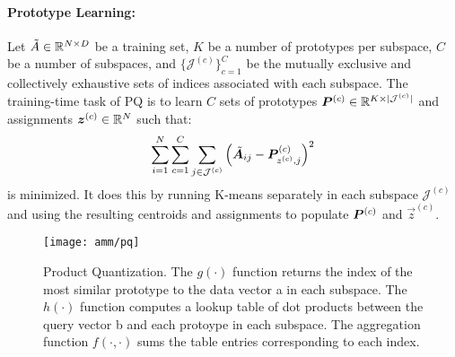 \paragraph{Prototype Learning:}

Let $\tilde{A} \in \mathbb{R}^{N \times D}$ be a training set, $K$ be a number of prototypes per subspace, $C$ be a number of subspaces, and $\{\mathcal{J}^{(c)}\}_{c=1}^C$ be the mutually exclusive and collectively exhaustive sets of indices associated with each subspace. The training-time task of PQ is to learn $C$ sets of prototypes $\bm{P}^{(c)} \in \mathbb{R}^{K \times |\mathcal{J}^{(c)}|}$ and assignments $\bm{z}^{(c)} \in \mathbb{R}^{N}$ such that:
\vspace{-2mm}
\begin{align}
    \sum_{i=1}^N \sum_{c=1}^C \sum_{j\in \mathcal{J}^{(c)}} \left( \tilde{\A}_{ij} - \mat{P}^{(c)}_{z^{(c)},j} \right)^2
\vspace*{-.5mm}
\end{align}
is minimized. It does this by running K-means separately in each subspace $\mathcal{J}^{(c)}$ and using the resulting centroids and assignments to populate $\bm{P}^{(c)}$ and $\vec{z}^{(c)}$.

\begin{figure}[t]
\begin{center}
\texttt{[image: amm/pq]}
\caption{Product Quantization. The $g(\cdot)$ function returns the index of the most similar prototype to the data vector a in each subspace. The $h(\cdot)$ function computes a lookup table of dot products between the query vector b and each protoype in each subspace. The aggregation function $f(\cdot,\cdot)$ sums the table entries corresponding to each index.}
\label{fig:pq}
\end{center}
\end{figure}




